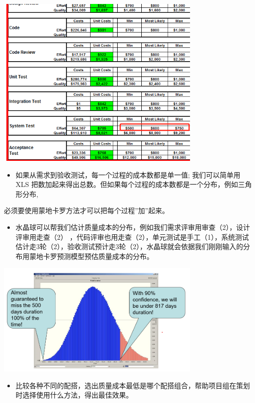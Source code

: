 \includegraphics[width=10cm]{微信截图_20211027012006.png}

\begin{itemize}
\tightlist
\item
  如果从需求到验收测试，每一个过程的成本数都是单一值; 我们可以简单用 XLS
  把数加起来得出总数。但如果每个过程的成本数都是一个分布，例如三角形分布,
\end{itemize}

必须要使用蒙地卡罗方法才可以把每个过程''加''起来。

\begin{itemize}
\tightlist
\item
  水晶球可以帮我们估计质量成本的分布，例如我们需求评审用审查（2），设计评审用走查（2）
  ，代码评审也用走查（2），单元测试是手工（1），系统测试估计走3轮（2），验收测试预计走3轮（2），水晶球就会依据我们刚刚输入的分布用蒙地卡罗预测模型预估质量成本的分布。
\end{itemize}


\includegraphics[width=10cm]{HmttDistScreenshot_2021-10-08_165836.png}

\begin{itemize}
\tightlist
\item
  比较各种不同的配搭，选出质量成本最低是哪个配搭组合，帮助项目组在策划时选择使用什么方法，得出最佳效果。
\end{itemize}

